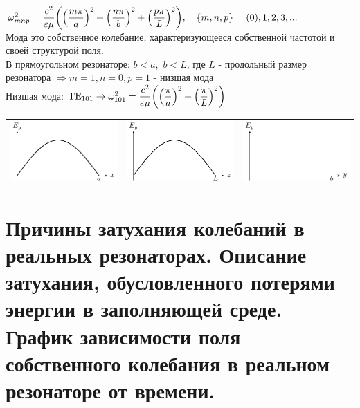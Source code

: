 \begin{multicols*}{2}
		$\omega_{mnp}^2=\dfrac{c^2}{\varepsilon\mu}\qty(\qty(\dfrac{m\pi}{a})^2+\qty(\dfrac{n\pi}{b})^2+\qty(\dfrac{p\pi}{L})^2),\quad \{m,n,p\} = (0),1,2,3,...$ \\
		Мода это собственное колебание, характеризующееся собственной частотой и своей структурой поля.\\
		В прямоугольном резонаторе: $b < a$,~$b < L$, где $L$ - продольный размер резонатора $\Rightarrow m = 1, n = 0, p = 1$ - низшая мода\\
		Низшая мода: ${\text{TE}}_{101} \rightarrow \omega_{101}^2 = \dfrac{c^2}{\varepsilon\mu}\qty(\qty(\dfrac{\pi}{a})^2+\qty(\dfrac{\pi}{L})^2)$ \\
		\begin{tabular}{l l l}
			\includegraphics[width=0.25\linewidth]{aed_imgs/ask11_1} &
			\includegraphics[width=0.25\linewidth]{aed_imgs/ask11_2} &
			\includegraphics[width=0.25\linewidth]{aed_imgs/ask11_3} \\
		\end{tabular}
		
		\section{Причины затухания колебаний в реальных резонаторах. Описание затухания, обусловленного потерями энергии в заполняющей среде. График зависимости поля собственного колебания в реальном резонаторе от времени.}
		

\end{multicols*}
